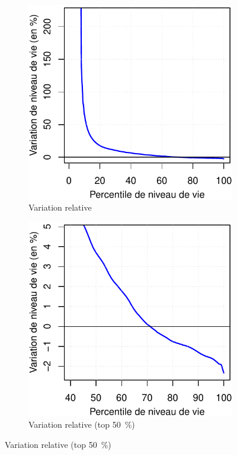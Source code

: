 \documentclass[a5paper,french,openany]{memoir}
\begin{document}
\begin{figure}[h!]
\begin{subfigure}{.5\textwidth}
\end{subfigure}
\\ \quad \\
\begin{subfigure}{.5\textwidth}
  \caption[]{Variation relative}\label{fig:evol_distr_c}
  \includegraphics[width=\textwidth]{../figures/policies/gcp_var_rev.pdf}
\end{subfigure} \quad
\begin{subfigure}{.5\textwidth}
  \caption[]{Variation relative (top 50~\%)}\label{fig:evol_distr_d}
  \includegraphics[width=\textwidth]{../figures/policies/gcp_var_rev_rich_only.pdf}

\end{subfigure}
\end{figure}
\end{document}
